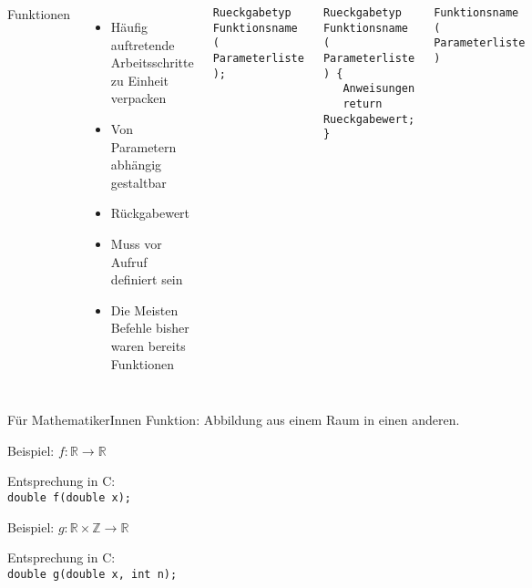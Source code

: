 \begin{frame}[fragile]
%
\begin{columns}[T]
\begin{Large}
Funktionen
\vspace{10pt}
\end{Large}
%
\begin{itemize}
\item Häufig auftretende Arbeitsschritte zu Einheit verpacken
\item Von Parametern abhängig gestaltbar
\item Rückgabewert
\item Muss vor Aufruf definiert sein
\item Die Meisten Befehle bisher waren bereits Funktionen
\end{itemize}
%
\begin{codebox}
\begin{verbatim}
Rueckgabetyp Funktionsname ( Parameterliste );
\end{verbatim}
\end{codebox}
%
\begin{codebox}
\begin{verbatim}
Rueckgabetyp Funktionsname ( Parameterliste ) {
   Anweisungen
   return Rueckgabewert;
}
\end{verbatim}
\end{codebox}
%
\begin{codebox}
\begin{verbatim}
Funktionsname ( Parameterliste )
\end{verbatim}
\end{codebox}
\end{columns}
%
\end{frame}


\begin{frame}{Für MathematikerInnen}
%
Funktion: Abbildung aus einem Raum in einen anderen.
\begin{center}

\end{center}
\begin{minipage}{.49\linewidth}
Beispiel: $f: \mathbb{R} \to \mathbb{R}$

Entsprechung in C:\\
\texttt{double f(double x);}
\end{minipage}
%
\begin{minipage}{.49\linewidth}
Beispiel: $g: \mathbb{R} \times \mathbb{Z} \to \mathbb{R}$

Entsprechung in C:\\
\texttt{double g(double x, int n);}
\end{minipage}
%
\end{frame}

